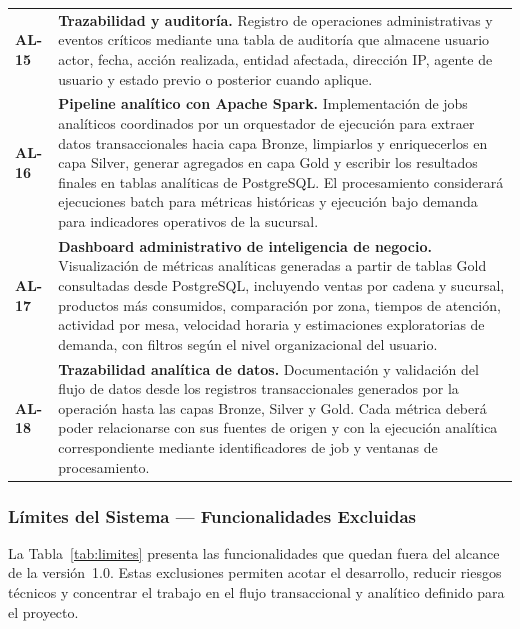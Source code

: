 {\begin{longtable}{>{\bfseries\centering}p{1.5cm} p{12.5cm}}
AL-15 & \textbf{Trazabilidad y auditoría.} Registro de operaciones administrativas y eventos críticos mediante una tabla de auditoría que almacene usuario actor, fecha, acción realizada, entidad afectada, dirección IP, agente de usuario y estado previo o posterior cuando aplique. \\
\rowcolor{altrow}
AL-16 & \textbf{Pipeline analítico con Apache Spark.} Implementación de jobs analíticos coordinados por un orquestador de ejecución para extraer datos transaccionales hacia capa Bronze, limpiarlos y enriquecerlos en capa Silver, generar agregados en capa Gold y escribir los resultados finales en tablas analíticas de PostgreSQL. El procesamiento considerará ejecuciones batch para métricas históricas y ejecución bajo demanda para indicadores operativos de la sucursal. \\
AL-17 & \textbf{Dashboard administrativo de inteligencia de negocio.} Visualización de métricas analíticas generadas a partir de tablas Gold consultadas desde PostgreSQL, incluyendo ventas por cadena y sucursal, productos más consumidos, comparación por zona, tiempos de atención, actividad por mesa, velocidad horaria y estimaciones exploratorias de demanda, con filtros según el nivel organizacional del usuario. \\
\rowcolor{altrow}
AL-18 & \textbf{Trazabilidad analítica de datos.} Documentación y validación del flujo de datos desde los registros transaccionales generados por la operación hasta las capas Bronze, Silver y Gold. Cada métrica deberá poder relacionarse con sus fuentes de origen y con la ejecución analítica correspondiente mediante identificadores de job y ventanas de procesamiento. \\
\end{longtable}
}

\newpage
\subsubsection{Límites del Sistema — Funcionalidades Excluidas}

La Tabla~\ref{tab:limites} presenta las funcionalidades que quedan fuera del alcance de la
versión~1.0. Estas exclusiones permiten acotar el desarrollo, reducir riesgos técnicos y
concentrar el trabajo en el flujo transaccional y analítico definido para el proyecto.

